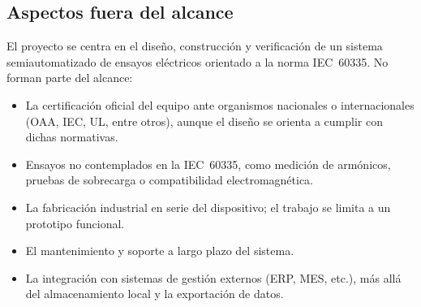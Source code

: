 \subsection{Aspectos fuera del alcance}

El proyecto se centra en el diseño, construcción y verificación de un sistema
semiautomatizado de ensayos eléctricos orientado a la norma IEC~60335. No forman
parte del alcance:
\begin{itemize}
    \item La certificación oficial del equipo ante organismos nacionales o
          internacionales (OAA, IEC, UL, entre otros), aunque el diseño se orienta
          a cumplir con dichas normativas.
    \item Ensayos no contemplados en la IEC~60335, como medición de armónicos,
          pruebas de sobrecarga o compatibilidad electromagnética.
    \item La fabricación industrial en serie del dispositivo; el trabajo se limita
          a un prototipo funcional.
    \item El mantenimiento y soporte a largo plazo del sistema.
    \item La integración con sistemas de gestión externos (ERP, MES, etc.), más
          allá del almacenamiento local y la exportación de datos.
\end{itemize}
